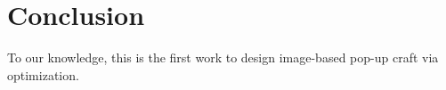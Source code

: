 \section{Conclusion}
To our knowledge, this is the first work to design image-based pop-up craft via optimization.